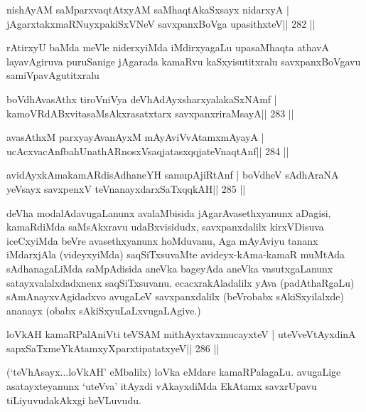 \begin{shl}
nishAyAM saMparxvaqtAtxyAM saMhaqtAkaSxsayx nidarxyA |
jAgarxtakxmaRNuyxpakiSxVNeV savxpanxBoVga upasithxteV\hfill || 282 ||
\end{shl}

\begin{artha}
rAtirxyU baMda meVle niderxyiMda iMdirxyagaLu upasaMhaqta athavA layavAgiruva puruSanige jAgarada kamaRvu kaSxyisutitxralu savxpanxBoVgavu samiVpavAgutitxralu 
\end{artha}

\begin{shl}
boVdhAvasAthx tiroVniVya deVhAdAyxsharxyalakaSxNAmf |
kamoVRdABxvitasaMsAkxrasatxtarx savxpanxriraMsayA\hfill || 283 ||
\end{shl}

\begin{shl}
avasAthxM parxyayAvanAyxM mAyAviVvA\s\s tamxmAyayA |
ucAcxvacAnfbahUnathARnosxV\s saqjatasxqqjateV\s naqtAnf\hfill || 284 ||
\end{shl}

\begin{shl}
avidAyxkAmakamARdisAdhaneYH samupAjiRtAnf |
boVdheV sAdhAraNA yeV\s sayx savxpenxV teV\s nanayxdarxSaTxqqkAH\hfill || 285 ||
\end{shl}

\begin{artha}
deVha modalAdavugaLanunx avalaMbisida jAgarAvasethxyanunx aDagisi, 
kamaRdiMda saMsAkxravu udaBxvisidudx, savxpanxdalilx kirxVDisuva 
iceCxyiMda beVre avasethxyanunx hoMduvanu, Aga mAyAviyu tananx 
iMdarxjAla (videyxyiMda) saqSiTxsuvaMte avideyx-kAma-kamaR muMtAda sAdhanagaLiMda saMpAdisida aneVka bageyAda aneVka vasutxgaLanunx satayxvalalxdadxnenx saqSiTxsuvanu. ecacxrakAladalilx yAva (padAthaRgaLu) sAmAnayxvAgidadxvo avugaLeV savxpanxdalilx (beVrobabx sAkiSxyilalxde) ananayx (obabx sAkiSxyuLaLxvugaLAgive.)
\end{artha}

\begin{shl}
loVkAH kamaRPalAniVti teVSAM mithAyxtavxmucayxteV |
uteVveVtAyxdinA sapxSaTxmeYkAtamxyXparxtipatatxyeV\hfill || 286 ||
\end{shl}

\begin{artha}
(`teVhAsayx...loVkAH' eMbalilx) loVka eMdare kamaRPalagaLu. avugaLige  asatayxteyanunx `uteVva' itAyxdi vAkayxdiMda EkAtamx savxrUpavu tiLiyuvudakAkxgi heVLuvudu.
\end{artha}

